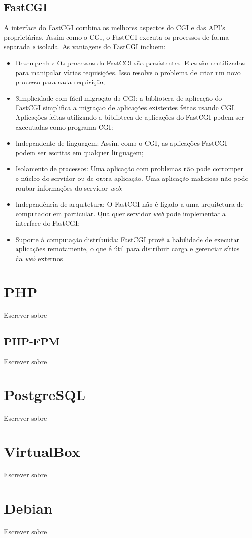 \subsection{FastCGI}
A interface do FastCGI combina os melhores aspectos do CGI e das API's proprietárias. Assim como o CGI, o FastCGI executa os processos de forma separada e isolada. As vantagens do FastCGI incluem:

\begin{itemize}
	\item Desempenho: Os processos do FastCGI são persistentes. Eles são reutilizados para manipular várias requisições. Isso resolve o problema de criar um novo processo para cada requisição;
	\item Simplicidade com fácil migração do CGI: a biblioteca de aplicação do FastCGI simplifica a migração de aplicações existentes feitas usando CGI. Aplicações feitas utilizando a biblioteca de aplicações do FastCGI podem ser executadas como programa CGI;
	\item Independente de linguagem: Assim como o CGI, as aplicações FastCGI podem ser escritas em qualquer linguagem;
	\item Isolamento de processos: Uma aplicação com problemas não pode corromper o núcleo do servidor ou de outra aplicação. Uma aplicação maliciosa não pode roubar informações do servidor \textit{web};
	\item Independência de arquitetura: O FastCGI não é ligado a uma arquitetura de computador em particular. Qualquer servidor \textit{web} pode implementar a interface do FastCGI;
	\item Suporte à computação distribuída: FastCGI provê a habilidade de executar aplicações remotamente, o que é útil para distribuir carga e gerenciar sítios da \textit{web} externos
\end{itemize}

\section{PHP}
Escrever sobre
\subsection{PHP-FPM}
Escrever sobre
\section{PostgreSQL}
Escrever sobre
\section{VirtualBox}
Escrever sobre
\section{Debian}
Escrever sobre